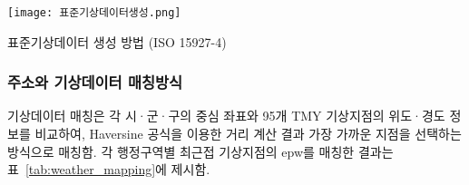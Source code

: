 \begin{defaultfigure}
  \texttt{[image: 표준기상데이터생성.png]}
  \caption{표준기상데이터 생성 방법 (ISO 15927-4)}
  \label{fig:tmyxalgorithm}
\end{defaultfigure}


\subsubsection{주소와 기상데이터 매칭방식}
\label{sec:address_weather_matching}
기상데이터 매칭은 각 시·군·구의 중심 좌표와 95개 TMY 기상지점의 위도·경도 정보를 비교하여, Haversine 공식을 이용한 거리 계산 결과 가장 가까운 지점을 선택하는 방식으로 매칭함. 
각 행정구역별 최근접 기상지점의 epw를 매칭한 결과는 표~\ref{tab:weather_mapping}에 제시함.

\renewcommand{\arraystretch}{0.8}
